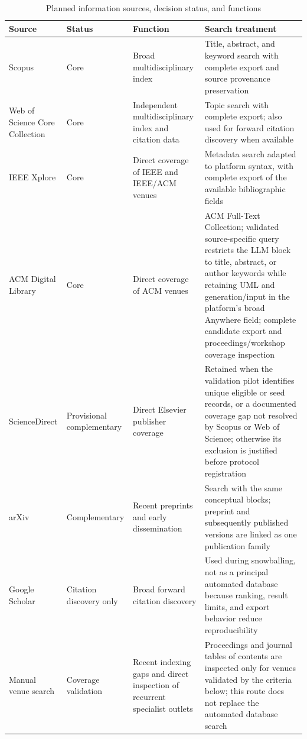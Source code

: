 \begin{table}[htbp]
\centering
\scriptsize
\caption{Planned information sources, decision status, and functions}
\label{tab:protocol_sources}
\begin{tabularx}{\textwidth}{p{} p{} p{} X}
\toprule
\textbf{Source} & \textbf{Status} & \textbf{Function} & \textbf{Search treatment} \\
\midrule
Scopus & Core & Broad multidisciplinary index & Title, abstract, and keyword search with complete export and source provenance preservation \\
Web of Science Core Collection & Core & Independent multidisciplinary index and citation data & Topic search with complete export; also used for forward citation discovery when available \\
IEEE Xplore & Core & Direct coverage of IEEE and IEEE/ACM venues & Metadata search adapted to platform syntax, with complete export of the available bibliographic fields \\
ACM Digital Library & Core & Direct coverage of ACM venues & ACM Full-Text Collection; validated source-specific query restricts the LLM block to title, abstract, or author keywords while retaining UML and generation/input in the platform's broad Anywhere field; complete candidate export and proceedings/workshop coverage inspection \\
ScienceDirect & Provisional complementary & Direct Elsevier publisher coverage & Retained when the validation pilot identifies unique eligible or seed records, or a documented coverage gap not resolved by Scopus or Web of Science; otherwise its exclusion is justified before protocol registration \\
arXiv & Complementary & Recent preprints and early dissemination & Search with the same conceptual blocks; preprint and subsequently published versions are linked as one publication family \\
Google Scholar & Citation discovery only & Broad forward citation discovery & Used during snowballing, not as a principal automated database because ranking, result limits, and export behavior reduce reproducibility \\
Manual venue search & Coverage validation & Recent indexing gaps and direct inspection of recurrent specialist outlets & Proceedings and journal tables of contents are inspected only for venues validated by the criteria below; this route does not replace the automated database search \\
\bottomrule
\end{tabularx}
\end{table}

